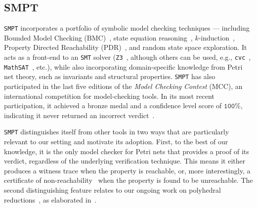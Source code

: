 	
\subsection{SMPT}


\texttt{SMPT} incorporates a portfolio of symbolic model checking techniques --- including Bounded Model Checking (BMC)~\cite{BiCiClZh99}, state equation reasoning~\cite{Mu77}, $k$-induction~\cite{BeDaWe18,ShSiSt20}, Property Directed Reachability (PDR)~\cite{Br11,AmDaHu22,ViGu14,BjGa15}, and random state space exploration. It acts as a front-end to an \texttt{SMT} solver (\texttt{Z3}~\cite{DeBj08}, although others can be used, e.g., \texttt{cvc}~\cite{BaCoDeHaJoKiReTi11,BaBaBrKrLaMaMoMoNiNo22}, \texttt{MathSAT}~\cite{CiGrScSe13}, etc.), while also incorporating domain-specific knowledge from Petri net theory, such as invariants and structural properties. \texttt{SMPT} has also participated in the last five editions of the \textit{Model Checking Contest} (MCC), an international competition for model-checking tools. In its most recent participation, it achieved a bronze medal and a confidence level score of  $\texttt{100\%}$, indicating it never returned an incorrect verdict~\cite{mcc:2025}.

\medskip
\texttt{SMPT} distinguishes itself from other tools in two ways that are particularly relevant to our setting and motivate its adoption. First, to the best of our knowledge, it is the only model checker for Petri nets that provides a proof of its verdict, regardless of the underlying verification technique. This means it either produces a witness trace when the property is reachable, or, more interestingly, a certificate of non-reachability~\cite{AmDaHu22} when the property is found to be unreachable.
%
The second distinguishing feature relates to our ongoing work on polyhedral reductions~\cite{AmBeDa21}, as elaborated in~.



